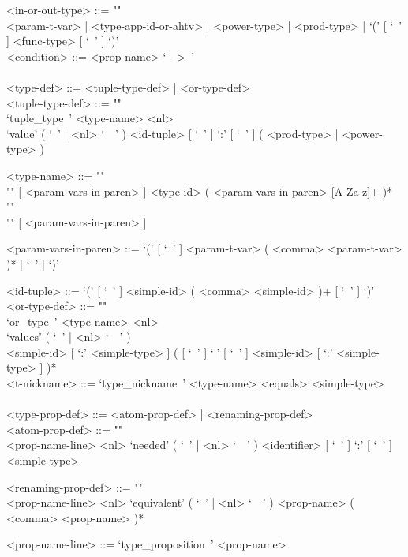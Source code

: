\documentclass[diploma]{softlab-thesis}
\begin{document}
\begin{grammar}
<in-or-out-type> ::= ""\\
<param-t-var> | <type-app-id-or-ahtv> | <power-type> | <prod-type> |
`(' [ `\ ' ] <func-type>  [ `\ ' ] `)'
\\

<condition> ::= <prop-name> `\ -->\ '
\\
\\

<type-def> ::= <tuple-type-def> | <or-type-def>
\\

<tuple-type-def> ::= ""\\
`tuple_type\ ' <type-name> <nl> \\
`value' ( `\ ' | <nl> `\ \ ' )
<id-tuple> [ `\ ' ] `:' [ `\ ' ] ( <prod-type> | <power-type> )

<type-name> ::= ""\\""
[ <param-vars-in-paren> ] <type-id> ( <param-vars-in-paren> [A-Za-z]+ )* ""\\""
[ <param-vars-in-paren> ]

<param-vars-in-paren> ::=
`(' [ `\ ' ] <param-t-var> ( <comma> <param-t-var> )* [ `\ ' ] `)'

<id-tuple> ::= `(' [ `\ ' ] <simple-id> ( <comma> <simple-id> )+ [ `\ ' ] `)'
\\

<or-type-def> ::= ""\\
`or_type\ ' <type-name> <nl> \\
`values' ( `\ ' | <nl> `\ \ ' ) \\
<simple-id> [ `:' <simple-type> ]
( [ `\ ' ] `|' [ `\ ' ] <simple-id> [ `:' <simple-type> ] )*
\\

<t-nickname> ::=
`type_nickname\ ' <type-name> <equals> <simple-type>
\\\\

<type-prop-def> ::= <atom-prop-def> | <renaming-prop-def>
\\

<atom-prop-def> ::= ""\\
<prop-name-line> <nl> `needed' ( `\ ' | <nl> `\ \ ' )
<identifier> [ `\ ' ] `:' [ `\ ' ] <simple-type>

<renaming-prop-def> ::= ""\\
<prop-name-line> <nl>
`equivalent' ( `\ ' | <nl> `\ \ ' ) <prop-name> ( <comma> <prop-name> )*

<prop-name-line> ::= `type_proposition\ ' <prop-name>


\end{grammar}
\end{document}
